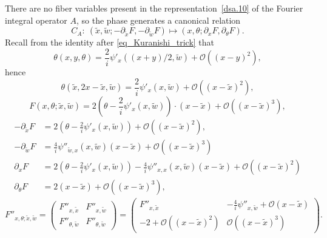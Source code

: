 \documentclass{article}
\begin{document}
There are no fiber variables present in the
representation~\eqref{dsa.10} of the Fourier integral operator $A$, so
the phase generates a canonical relation
\begin{equation}\label{dsa.12}
  C_A:\ (\widetilde{x},\widetilde{w};-\partial
  _{\widetilde{x}}F,-\partial _{\widetilde{w}}F)\mapsto (x,\theta
  ;\partial _x F,\partial _\theta F).
\end{equation}
Recall from the identity after \eqref{eq_Kuranishi_trick} that
\[
\theta (x,y,\theta) =
\frac{2}{i}\psi'_x((x+y)/2,\widetilde{w})+\mathcal{O}((x-y)^2),
\]
hence
\[
\theta (\widetilde{x},2x-\widetilde{x},\widetilde{w}) =
\frac{2}{i}\psi'_x(x,\widetilde{w})+\mathcal{O}((x-\widetilde{x})^2),
\]
\begin{equation}\label{dsa.13}
  F(x,\theta ;\widetilde{x},\widetilde{w})=2\left(\theta
    -\frac{2}{i}\psi '_x(x,\widetilde{w}) \right)\cdot
  (x-\widetilde{x})+\mathcal{O}((x-\widetilde{x})^3),
\end{equation}
\begin{equation}\label{dsa.14}
  \begin{split}
    -\partial_{\widetilde{x}}F&= 2\left(\theta -\frac{2}{i}\psi
      '_x(x,\widetilde{w}) \right)+\mathcal{ O}((x-\widetilde{x})^2),\\
    -\partial _{\widetilde{w}}F&=\frac{4}{i}\psi
    ''_{\widetilde{w},x}(x,\widetilde{w})(x-\widetilde{x})+\mathcal{
      O}((x-\widetilde{x})^3)\\
    \partial _xF&=2\left(\theta -\frac{2}{i}\psi
      '_x(x,\widetilde{w})\right) -\frac{4}{i}\psi
    ''_{x,x}(x,\widetilde{w})(x-\widetilde{x})
    +\mathcal{ O}((x-\widetilde{x})^2)\\
    \partial _\theta F&=2(x-\widetilde{x})+\mathcal{
      O}((x-\widetilde{x})^3),
  \end{split}
\end{equation}
\begin{equation}\label{dsa.15}
  F''_{x,\theta
    ;\widetilde{x},\widetilde{w}}=\begin{pmatrix}F''_{x,\widetilde{x}}
    &F''_{x,\widetilde{w}}\\
    F''_{\theta ,\widetilde{w}} &F''_{\theta ,\widetilde{w}}\end{pmatrix}
  =\begin{pmatrix}
    F''_{x,\widetilde{x}} &-\frac{4}{i}\psi ''_{x,\widetilde{w}}+\mathcal{
      O}(x-\widetilde{x})\\
    -2+\mathcal{ O}((x-\widetilde{x})^2) &\mathcal{ O}((x-\widetilde{x})^3)
  \end{pmatrix} .
\end{equation}
\end{document}
